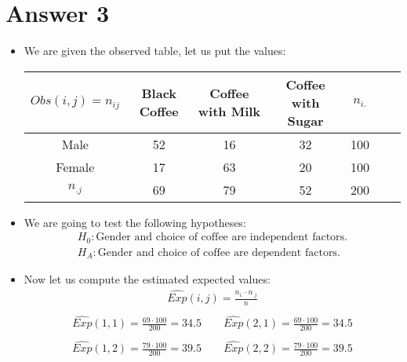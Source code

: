 \documentclass[12pt]{article}
\begin{document}
\section*{Answer 3}
\begin{itemize}
    \item We are given the observed table, let us put the values:
    \begin{table}[H]
        \small
        \centering
        \begin{tabular}{|c|c|c|c|c|c|c|}
        \hline
        $Obs(i,j) = n_{ij}$ & Black Coffee & Coffee with Milk & Coffee with Sugar & $n_{i.}$ \\
        \hline
        Male & 52 & 16 & 32 & 100\\
        Female & 17 & 63 & 20 & 100\\
        \hline
        $n_{.j}$ & 69 & 79 & 52 & 200\\
        \hline
        \end{tabular}
    \end{table}
    \item We are going to test the following hypotheses:
    \begin{equation*}
        \begin{split}
            H_0: \text{Gender and choice of coffee are independent factors.} \\
            H_A: \text{Gender and choice of coffee are dependent factors.}
        \end{split}
    \end{equation*}
    \item Now let us compute the estimated expected values:
    \begin{equation*}
        \begin{split}
            \widehat{Exp}(i,j) = \frac{n_{i.} \cdot n_{.j}}{n} \\
        \end{split}
    \end{equation*}
    \begin{equation*}
        \begin{split}
            \widehat{Exp}(1,1) = \frac{69 \cdot 100}{200} = 34.5 \quad \quad \widehat{Exp}(2,1) = \frac{69 \cdot 100}{200} = 34.5 \\ \\
            \widehat{Exp}(1,2) = \frac{79 \cdot 100}{200} = 39.5 \quad \quad \widehat{Exp}(2,2) = \frac{79 \cdot 100}{200} = 39.5 \\ \\

\end{split}
\end{equation*}
\end{itemize}
\end{document}
